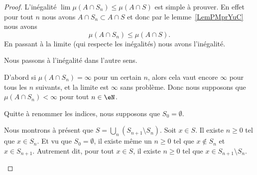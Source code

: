 \begin{proof}
	L'inégalité \( \lim\mu(A\cap S_n)\leq \mu(A\cap S)\) est simple à prouver. En effet pour tout \( n\) nous avons \( A\cap S_n\subset A\cap S\) et donc par le lemme~\ref{LemPMprYuC} nous avons
	\begin{equation}
		\mu(A\cap S_n)\leq\mu(A\cap S).
	\end{equation}
	En passant à la limite (qui respecte les inégalités) nous avons l'inégalité.

	Nous passons à l'inégalité dans l'autre sens.

	\begin{subproof}
		\spitem[Si \( \infty\)]
		D'abord si \( \mu(A\cap S_n)=\infty\) pour un certain \( n\), alors cela vaut encore \( \infty\) pour tous les \( n\) suivants, et la limite est \( \infty\) sans problème. Donc nous supposons que \( \mu(A\cap S_n)<\infty\) pour tout \( n\in \eN\).

		Quitte à renommer les indices, nous supposons que \( S_0=\emptyset\).

		Nous montrons à présent que \( S=\bigcup_n(S_{n+1}\setminus S_n)\). Soit \( x\in S\). Il existe \( n\geq 0\) tel que \( x\in S_n\). Et vu que \( S_0=\emptyset\), il existe même un \( n\geq 0\) tel que \( x\notin S_n\) et \( x\in S_{n+1}\). Autrement dit, pour tout \( x\in S\), il existe \( n\geq 0\) tel que \( x\in S_{n+1}\setminus S_n\).


\end{subproof}
\end{proof}
